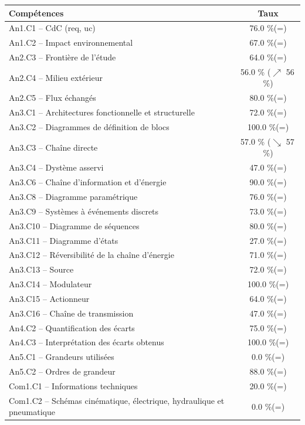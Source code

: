 \footnotesize 
\begin{center} 
\begin{tabular}{|p{.7\linewidth}|c|} 
\hline 
Compétences  & Taux \\ \hline \hline 
An1.C1 -- CdC (req, uc)&76.0 \%(=)\\ \hline 
An1.C2 -- Impact environnemental&67.0 \%(=)\\ \hline 
An2.C3 -- Frontière de l’étude&64.0 \%(=)\\ \hline 
An2.C4 -- Milieu extérieur&56.0 \% ($\nearrow$ 56\,\%)\\ \hline 
An2.C5 -- Flux échangés&80.0 \%(=)\\ \hline 
An3.C1 -- Architectures fonctionnelle et structurelle&72.0 \%(=)\\ \hline 
An3.C2 -- Diagrammes de définition de blocs&100.0 \%(=)\\ \hline 
An3.C3 -- Chaîne directe&57.0 \% ($\searrow$ 57\,\%)\\ \hline 
An3.C4 -- Dystème asservi&47.0 \%(=)\\ \hline 
An3.C6 -- Chaîne d’information et d'énergie&90.0 \%(=)\\ \hline 
An3.C8 -- Diagramme paramétrique&76.0 \%(=)\\ \hline 
An3.C9 -- Systèmes à événements discrets&73.0 \%(=)\\ \hline 
An3.C10 -- Diagramme de séquences&80.0 \%(=)\\ \hline 
An3.C11 -- Diagramme d’états&27.0 \%(=)\\ \hline 
An3.C12 -- Réversibilité de la chaîne d’énergie&71.0 \%(=)\\ \hline 
An3.C13 -- Source&72.0 \%(=)\\ \hline 
An3.C14 -- Modulateur&100.0 \%(=)\\ \hline 
An3.C15 -- Actionneur&64.0 \%(=)\\ \hline 
An3.C16 -- Chaîne de transmission&47.0 \%(=)\\ \hline 
An4.C2 -- Quantification des écarts&75.0 \%(=)\\ \hline 
An4.C3 -- Interprétation des écarts obtenus&100.0 \%(=)\\ \hline 
An5.C1 -- Grandeurs utilisées &0.0 \%(=)\\ \hline 
An5.C2 -- Ordres de grandeur&88.0 \%(=)\\ \hline 
Com1.C1 -- Informations techniques&20.0 \%(=)\\ \hline 
Com1.C2 -- Schémas cinématique, électrique, hydraulique et pneumatique&0.0 \%(=)\\ \hline 

\end{tabular}
\end{center}
